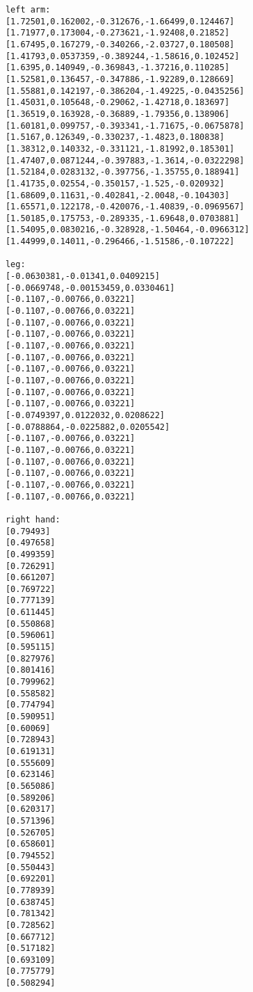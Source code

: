 \documentclass{CSSRforAfrica}
\begin{document}
\begin{verbatim}
            left arm: 
            [1.72501,0.162002,-0.312676,-1.66499,0.124467] 
            [1.71977,0.173004,-0.273621,-1.92408,0.21852] 
            [1.67495,0.167279,-0.340266,-2.03727,0.180508] 
            [1.41793,0.0537359,-0.389244,-1.58616,0.102452] 
            [1.6395,0.140949,-0.369843,-1.37216,0.110285] 
            [1.52581,0.136457,-0.347886,-1.92289,0.128669] 
            [1.55881,0.142197,-0.386204,-1.49225,-0.0435256] 
            [1.45031,0.105648,-0.29062,-1.42718,0.183697] 
            [1.36519,0.163928,-0.36889,-1.79356,0.138906] 
            [1.60181,0.099757,-0.393341,-1.71675,-0.0675878] 
            [1.5167,0.126349,-0.330237,-1.4823,0.180838] 
            [1.38312,0.140332,-0.331121,-1.81992,0.185301] 
            [1.47407,0.0871244,-0.397883,-1.3614,-0.0322298] 
            [1.52184,0.0283132,-0.397756,-1.35755,0.188941] 
            [1.41735,0.02554,-0.350157,-1.525,-0.020932] 
            [1.68609,0.11631,-0.402841,-2.0048,-0.104303] 
            [1.65571,0.122178,-0.420076,-1.40839,-0.0969567] 
            [1.50185,0.175753,-0.289335,-1.69648,0.0703881] 
            [1.54095,0.0830216,-0.328928,-1.50464,-0.0966312] 
            [1.44999,0.14011,-0.296466,-1.51586,-0.107222] 

            leg: 
            [-0.0630381,-0.01341,0.0409215] 
            [-0.0669748,-0.00153459,0.0330461] 
            [-0.1107,-0.00766,0.03221] 
            [-0.1107,-0.00766,0.03221] 
            [-0.1107,-0.00766,0.03221] 
            [-0.1107,-0.00766,0.03221] 
            [-0.1107,-0.00766,0.03221] 
            [-0.1107,-0.00766,0.03221] 
            [-0.1107,-0.00766,0.03221] 
            [-0.1107,-0.00766,0.03221] 
            [-0.1107,-0.00766,0.03221] 
            [-0.1107,-0.00766,0.03221] 
            [-0.0749397,0.0122032,0.0208622] 
            [-0.0788864,-0.0225882,0.0205542] 
            [-0.1107,-0.00766,0.03221] 
            [-0.1107,-0.00766,0.03221] 
            [-0.1107,-0.00766,0.03221] 
            [-0.1107,-0.00766,0.03221] 
            [-0.1107,-0.00766,0.03221] 
            [-0.1107,-0.00766,0.03221] 

            right hand: 
            [0.79493] 
            [0.497658] 
            [0.499359] 
            [0.726291] 
            [0.661207] 
            [0.769722] 
            [0.777139] 
            [0.611445] 
            [0.550868] 
            [0.596061] 
            [0.595115] 
            [0.827976] 
            [0.801416] 
            [0.799962] 
            [0.558582] 
            [0.774794] 
            [0.590951] 
            [0.60069] 
            [0.728943] 
            [0.619131] 
            [0.555609] 
            [0.623146] 
            [0.565086] 
            [0.589206] 
            [0.620317] 
            [0.571396] 
            [0.526705] 
            [0.658601] 
            [0.794552] 
            [0.550443] 
            [0.692201] 
            [0.778939] 
            [0.638745] 
            [0.781342] 
            [0.728562] 
            [0.667712] 
            [0.517182] 
            [0.693109] 
            [0.775779] 
            [0.508294] 


\end{verbatim}
\end{document}
